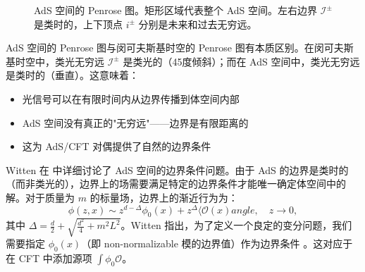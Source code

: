 \begin{figure}[htbp]
\centering
{}
\caption{AdS 空间的 Penrose 图。矩形区域代表整个 AdS 空间。左右边界 $\mathscr{I}^\pm$ 是类时的，上下顶点 $i^\pm$ 分别是未来和过去无穷远。}
\label{fig:AdS_Penrose}
\end{figure}

\begin{remark}
AdS 空间的 Penrose 图与闵可夫斯基时空的 Penrose 图有本质区别。在闵可夫斯基时空中，类光无穷远 $\mathscr{I}^\pm$ 是类光的（45度倾斜）；而在 AdS 空间中，类光无穷远是类时的（垂直）。这意味着：
\begin{itemize}
    \item 光信号可以在有限时间内从边界传播到体空间内部
    \item AdS 空间没有真正的"无穷远"——边界是有限距离的
    \item 这为 AdS/CFT 对偶提供了自然的边界条件
\end{itemize}
\end{remark}

\begin{remark}
Witten 在 \cite{Witten1998} 中详细讨论了 AdS 空间的边界条件问题。由于 AdS 的边界是类时的（而非类光的），边界上的场需要满足特定的边界条件才能唯一确定体空间中的解。对于质量为 $m$ 的标量场，边界上的渐近行为为：
\begin{equation}
    \phi(z, x) \sim z^{d-\Delta} \phi_0(x) + z^\Delta \langle \mathcal{O}(x) 
angle, \quad z \to 0,
\end{equation}
其中 $\Delta = \frac{d}{2} + \sqrt{\frac{d^2}{4} + m^2 L^2}$。Witten 指出，为了定义一个良定的变分问题，我们需要指定 $\phi_0(x)$（即 non-normalizable 模的边界值）作为边界条件 \cite{Witten1998}。这对应于在 CFT 中添加源项 $\int \phi_0 \mathcal{O}$。
\end{remark}

